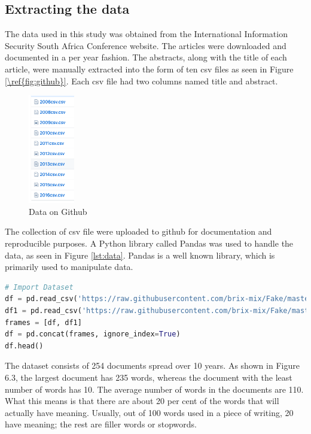 \subsection{Extracting the data}

The data used in this study was obtained from the International Information Security South Africa Conference website. The articles were downloaded and documented in a per year fashion. The abstracts, along with the title of each article, were manually extracted into the form of ten csv files as seen in Figure \ref{\ref{fig:github}}. Each csv file had two columns named title and abstract. 

\begin{figure}[h!]
\centering
\includegraphics[width=2cm]{./figures/github.png}
\caption{Data on Github}
\label{fig:github}
\end{figure}

The collection of csv file were uploaded to github for documentation and reproducible purposes. A Python library called Pandas was used to handle the data, as seen in Figure \ref{lst:data}. Pandas is a well known library, which is primarily used to manipulate data.

\begin{lstlisting}[language=Python, label={lst:data}, caption=Importing data to the system]
# Import Dataset
df = pd.read_csv('https://raw.githubusercontent.com/brix-mix/Fake/master/2006csv.csv', usecols = ['abstracts','title'])
df1 = pd.read_csv('https://raw.githubusercontent.com/brix-mix/Fake/master/2008csv.csv', usecols = ['abstracts','title'])
frames = [df, df1]
df = pd.concat(frames, ignore_index=True)
df.head()
\end{lstlisting}

The dataset consists of 254 documents spread over 10 years. As shown in Figure 6.3, the largest document has 235 words, whereas the document with the least number of words has 10. The average number of words in the documents are 110. What this means is that there are about  20 per cent of the words that will actually have meaning. Usually, out of 100 words used in a piece of writing, 20 have meaning; the rest are filler words or stopwords.

